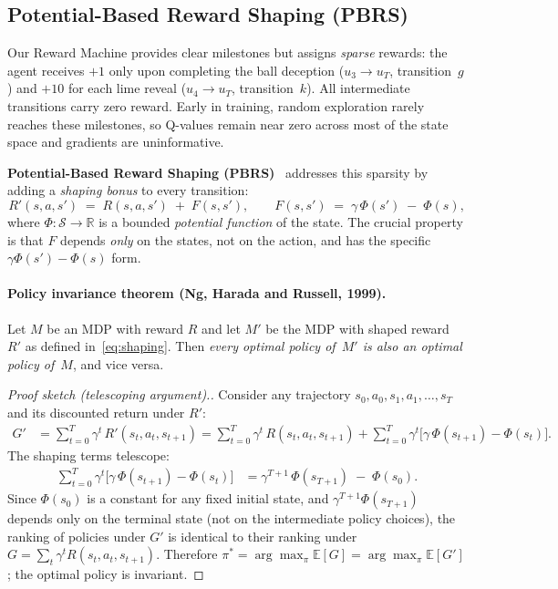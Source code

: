 \documentclass[11pt]{article}
\begin{document}
\subsection{Potential-Based Reward Shaping (PBRS)}
\label{sec:pbrs}

Our Reward Machine provides clear milestones but assigns \emph{sparse} rewards: the agent receives $+1$ only upon completing the ball deception ($u_3 \!\to\! u_T$, transition~$g$) and $+10$ for each lime reveal ($u_4 \!\to\! u_T$, transition~$k$).
All intermediate transitions carry zero reward.
Early in training, random exploration rarely reaches these milestones, so Q-values remain near zero across most of the state space and gradients are uninformative.

\textbf{Potential-Based Reward Shaping (PBRS)}~\cite{ng1999} addresses this sparsity by adding a \emph{shaping bonus} to every transition:
\begin{equation}
\label{eq:shaping}
R'(s, a, s') \;=\; R(s, a, s') \;+\; F(s, s'),
\qquad
F(s, s') \;=\; \gamma\,\Phi(s') \;-\; \Phi(s),
\end{equation}
where $\Phi : \mathcal{S} \to \mathbb{R}$ is a bounded \emph{potential function} of the state.
The crucial property is that $F$ depends \emph{only} on the states, not on the action, and has the specific $\gamma\Phi(s') - \Phi(s)$ form.

\paragraph{Policy invariance theorem (Ng, Harada and Russell, 1999).}
Let $M$ be an MDP with reward $R$ and let $M'$ be the MDP with shaped reward $R'$ as defined in~\eqref{eq:shaping}.
Then \emph{every optimal policy of~$M'$ is also an optimal policy of~$M$}, and vice versa.

\begin{proof}[Proof sketch (telescoping argument).]
Consider any trajectory $s_0, a_0, s_1, a_1, \ldots, s_T$ and its discounted return under $R'$:
\begin{align}
G' &= \sum_{t=0}^{T} \gamma^t\, R'(s_t, a_t, s_{t+1})
     = \sum_{t=0}^{T} \gamma^t\, R(s_t, a_t, s_{t+1})
       + \sum_{t=0}^{T} \gamma^t\bigl[\gamma\,\Phi(s_{t+1}) - \Phi(s_t)\bigr]. \label{eq:telescope1}
\end{align}
The shaping terms telescope:
\begin{align}
\sum_{t=0}^{T} \gamma^t\bigl[\gamma\,\Phi(s_{t+1}) - \Phi(s_t)\bigr]
  &= \gamma^{T+1}\,\Phi(s_{T+1}) \;-\; \Phi(s_0). \label{eq:telescope2}
\end{align}
Since $\Phi(s_0)$ is a constant for any fixed initial state, and $\gamma^{T+1}\Phi(s_{T+1})$ depends only on the terminal state (not on the intermediate policy choices), the ranking of policies under $G'$ is identical to their ranking under~$G = \sum_t \gamma^t R(s_t,a_t,s_{t+1})$.
Therefore $\pi^* = \arg\max_\pi \mathbb{E}[G] = \arg\max_\pi \mathbb{E}[G']$; the optimal policy is invariant.
\end{proof}
\end{document}
